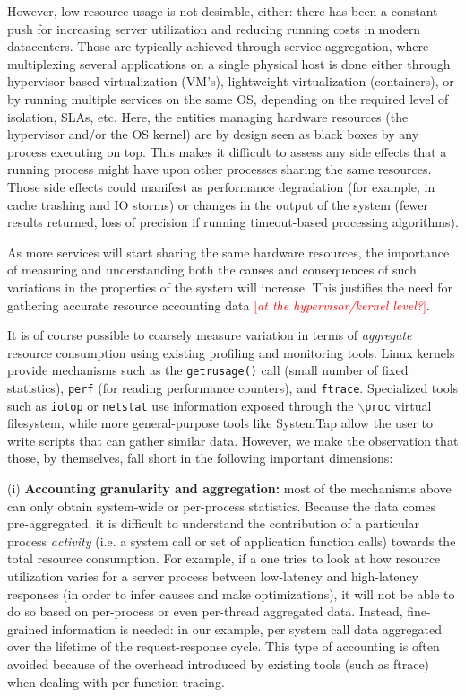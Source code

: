 \documentclass[letterpaper,twocolumn,10pt]{article}
\newcommand{\lnote}[1]{\textcolor{red}{[\textit{#1}]}} %
\begin{document}
However, low resource usage is not desirable, either: there has been a constant push for increasing server utilization and reducing running costs in modern datacenters. Those are typically achieved through service aggregation, where multiplexing several applications on a single physical host is done either through hypervisor-based virtualization (VM's), lightweight virtualization (containers), or by running multiple services on the same OS, depending on the required level of isolation, SLAs, etc. 
Here, the entities managing hardware resources (the hypervisor and/or the OS kernel) are by design seen as black boxes by any process executing on top. This makes it difficult to assess any side effects that a running process might have upon other processes sharing the same resources. Those side effects could manifest as performance degradation (for example, in cache trashing and IO storms) or changes in the output of the system (fewer results returned, loss of precision if running timeout-based processing algorithms).

As more services will start sharing the same hardware resources, the importance of measuring and understanding both the causes and consequences of such variations in the properties of the system will increase. This justifies the need for gathering accurate resource accounting data \lnote{at the hypervisor/kernel level?}.

It is of course possible to coarsely measure variation in terms of \textit{aggregate} resource consumption using existing profiling and monitoring tools. Linux kernels provide mechanisms such as the \texttt{getrusage()} call (small number of fixed statistics), \texttt{perf} (for reading performance counters), and \texttt{ftrace}. Specialized tools such as \texttt{iotop} or \texttt{netstat} use information exposed through the \texttt{$\backslash$proc} virtual filesystem, while more general-purpose tools like SystemTap allow the user to write scripts that can gather similar data. However, we make the observation that those, by themselves, fall short in the following important dimensions: 

(i) \textbf{Accounting granularity and aggregation:} most of the mechanisms above can only obtain system-wide or per-process statistics. Because the data comes pre-aggregated, it is difficult to understand the contribution of a particular process \textit{activity} (i.e. a system call or set of application function calls) towards the total resource consumption. For example, if a one tries to look at how resource utilization varies for a server process between low-latency and high-latency responses (in order to infer causes and make optimizations), it will not be able to do so based on per-process or even per-thread aggregated data. Instead, fine-grained information is needed: in our example, per system call data aggregated over the lifetime of the request-response cycle. This type of accounting is often avoided because of the overhead introduced by existing tools (such as ftrace) when dealing with per-function tracing.
\end{document}
